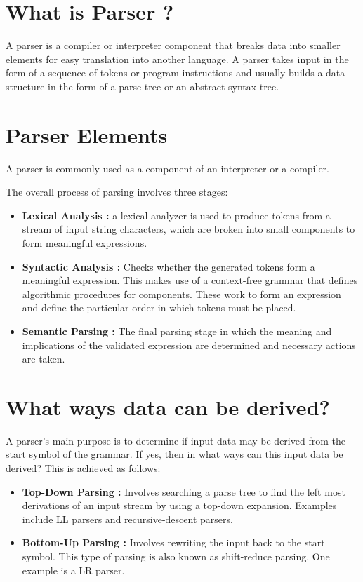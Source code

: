 \documentclass[12pt]{article}
\begin{document}
\tableofcontents

\section{What is Parser ?}

A parser is a compiler or interpreter component that breaks data into smaller elements for easy translation into another language. A parser takes input in the form of a sequence of tokens or program instructions and usually builds a data structure in the form of a parse tree or an abstract syntax tree.


\section{Parser Elements}

A parser is commonly used as a component of an interpreter or a compiler. 

The overall process of parsing involves three stages:

\begin{itemize}
	\item \textbf{Lexical Analysis :} a lexical analyzer is used to produce tokens from a stream of input string characters, which are broken into small components to form meaningful expressions.
	\item \textbf{Syntactic Analysis :} Checks whether the generated tokens form a meaningful expression. This makes use of a context-free grammar that defines algorithmic procedures for components. These work to form an expression and define the particular order in which tokens must be placed.
	\item \textbf{Semantic Parsing :} The final parsing stage in which the meaning and implications of the validated expression are determined and necessary actions are taken.
\end{itemize}



\section{What ways data can be derived?}

A parser's main purpose is to determine if input data may be derived from the start symbol of the grammar. If yes, then in what ways can this input data be derived? This is achieved as follows:


\begin{itemize}
	\item \textbf{Top-Down Parsing : } Involves searching a parse tree to find the left most derivations of an input stream by using a top-down expansion. Examples include LL parsers and recursive-descent parsers.
	\item \textbf{Bottom-Up Parsing : } Involves rewriting the input back to the start symbol. This type of parsing is also known as shift-reduce parsing. One example is a LR parser.
\end{itemize}
\end{document}
